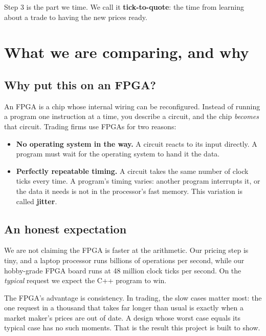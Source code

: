 \documentclass[11pt]{article}
\begin{document}
Step 3 is the part we time. We call it \textbf{tick-to-quote}: the time from
learning about a trade to having the new prices ready.

\section{What we are comparing, and why}

\subsection{Why put this on an FPGA?}

An FPGA is a chip whose internal wiring can be reconfigured. Instead of
running a program one instruction at a time, you describe a circuit, and the
chip \emph{becomes} that circuit. Trading firms use FPGAs for two reasons:

\begin{itemize}
  \item \textbf{No operating system in the way.} A circuit reacts to its
        input directly. A program must wait for the operating system to hand
        it the data.
  \item \textbf{Perfectly repeatable timing.} A circuit takes the same number
        of clock ticks every time. A program's timing varies: another program
        interrupts it, or the data it needs is not in the processor's fast
        memory. This variation is called \textbf{jitter}.
\end{itemize}

\subsection{An honest expectation}

We are not claiming the FPGA is faster at the arithmetic. Our pricing step is
tiny, and a laptop processor runs billions of operations per second, while our
hobby-grade FPGA board runs at 48 million clock ticks per second. On the
\emph{typical} request we expect the C++ program to win.

The FPGA's advantage is consistency. In trading, the slow cases matter most:
the one request in a thousand that takes far longer than usual is exactly when
a market maker's prices are out of date. A design whose worst case equals its
typical case has no such moments. That is the result this project is built to
show.
\end{document}
